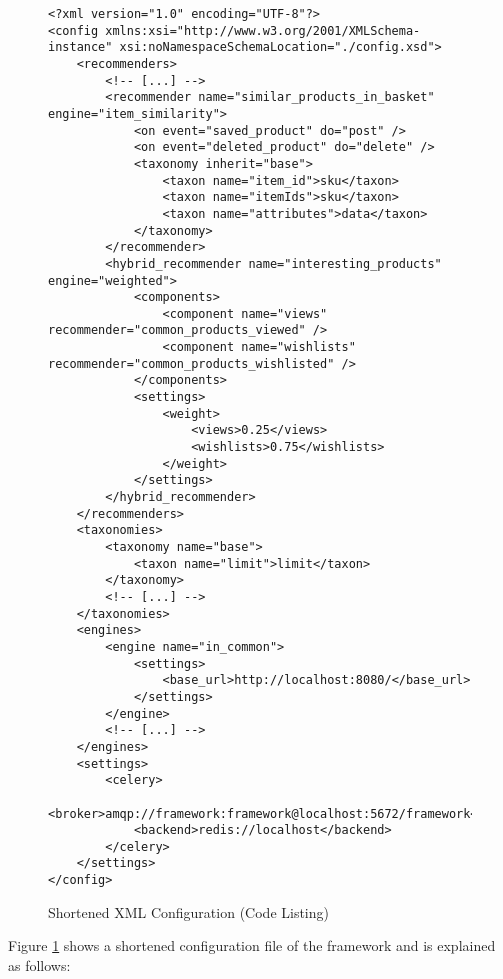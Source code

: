 \begin{figure}[ht!]
    \begin{verbatim}
<?xml version="1.0" encoding="UTF-8"?>
<config xmlns:xsi="http://www.w3.org/2001/XMLSchema-instance" xsi:noNamespaceSchemaLocation="./config.xsd">
    <recommenders>
        <!-- [...] -->
        <recommender name="similar_products_in_basket" engine="item_similarity">
            <on event="saved_product" do="post" />
            <on event="deleted_product" do="delete" />
            <taxonomy inherit="base">
                <taxon name="item_id">sku</taxon>
                <taxon name="itemIds">sku</taxon>
                <taxon name="attributes">data</taxon>
            </taxonomy>
        </recommender>
        <hybrid_recommender name="interesting_products" engine="weighted">
            <components>
                <component name="views" recommender="common_products_viewed" />
                <component name="wishlists" recommender="common_products_wishlisted" />
            </components>
            <settings>
                <weight>
                    <views>0.25</views>
                    <wishlists>0.75</wishlists>
                </weight>
            </settings>
        </hybrid_recommender>
    </recommenders>
    <taxonomies>
        <taxonomy name="base">
            <taxon name="limit">limit</taxon>
        </taxonomy>
        <!-- [...] -->
    </taxonomies>
    <engines>
        <engine name="in_common">
            <settings>
                <base_url>http://localhost:8080/</base_url>
            </settings>
        </engine>
        <!-- [...] -->
    </engines>
    <settings>
        <celery>
            <broker>amqp://framework:framework@localhost:5672/framework</broker>
            <backend>redis://localhost</backend>
        </celery>
    </settings>
</config>
    \end{verbatim}
    \caption{Shortened XML Configuration (Code Listing)}
    \label{fig:implementation-framework-configuration}
\end{figure}

Figure \ref{fig:implementation-framework-configuration} shows a shortened configuration file of the framework and is explained as follows:

